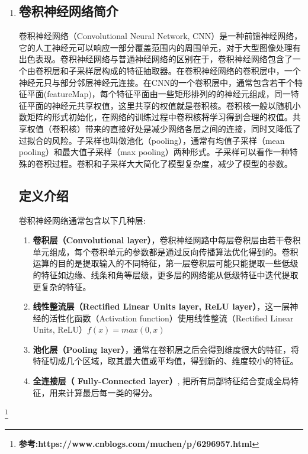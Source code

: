 \documentclass[a4paper,UTF8]{article}
\numberwithin{equation}{section}
\begin{document}
\begin{enumerate}[(1)]
	\item 
	\subsection{卷积神经网络简介}
	卷积神经网络（Convolutional Neural Network, CNN）是一种前馈神经网络，它的人工神经元可以响应一部分覆盖范围内的周围单元，对于大型图像处理有出色表现。卷积神经网络与普通神经网络的区别在于，卷积神经网络包含了一个由卷积层和子采样层构成的特征抽取器。在卷积神经网络的卷积层中，一个神经元只与部分邻层神经元连接。在CNN的一个卷积层中，通常包含若干个特征平面(featureMap)，每个特征平面由一些矩形排列的的神经元组成，同一特征平面的神经元共享权值，这里共享的权值就是卷积核。卷积核一般以随机小数矩阵的形式初始化，在网络的训练过程中卷积核将学习得到合理的权值。共享权值（卷积核）带来的直接好处是减少网络各层之间的连接，同时又降低了过拟合的风险。子采样也叫做池化（pooling），通常有均值子采样（mean pooling）和最大值子采样（max pooling）两种形式。子采样可以看作一种特殊的卷积过程。卷积和子采样大大简化了模型复杂度，减少了模型的参数。
	\subsection{定义介绍}
	卷积神经网络通常包含以下几种层:\\
	\begin{enumerate}
		\item \textbf{卷积层（Convolutional layer）}，卷积神经网路中每层卷积层由若干卷积单元组成，每个卷积单元的参数都是通过反向传播算法优化得到的。卷积运算的目的是提取输入的不同特征，第一层卷积层可能只能提取一些低级的特征如边缘、线条和角等层级，更多层的网络能从低级特征中迭代提取更复杂的特征。
		\item \textbf{线性整流层（Rectified Linear Units layer, ReLU layer）}，这一层神经的活性化函数（Activation function）使用线性整流（Rectified Linear Units, ReLU）$f(x)=max(0,x)$
		\item \textbf{池化层（Pooling layer）}，通常在卷积层之后会得到维度很大的特征，将特征切成几个区域，取其最大值或平均值，得到新的、维度较小的特征。
		\item \textbf{全连接层（ Fully-Connected layer）}, 把所有局部特征结合变成全局特征，用来计算最后每一类的得分。
	\end{enumerate}
	
	
	
\end{enumerate}
\footnote{\textbf{参考:https://www.cnblogs.com/muchen/p/6296957.html}}
\end{document}
